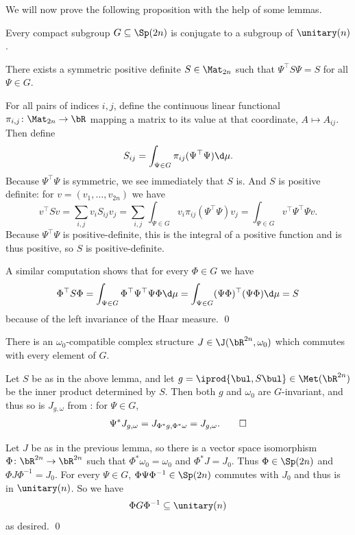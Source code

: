 We will now prove the following proposition with the help of some lemmas.

\bprop[name={compspconj}]

    Every compact subgroup $G\subseteq\Sp(2n)$ is conjugate to a subgroup of $\unitary(n)$.

\eprop

\blemm

    There exists a symmetric positive definite $S\in\Mat_{2n}$ such that $\Psi^\top S\Psi=S$ for all $\Psi\in G$.

\elemm

\bproof

    For all pairs of indices $i,j$, define the continuous linear functional $\pi_{i,j}\colon\Mat_{2n}\to\bR$ mapping a matrix to its value at that coordinate, $A\mapsto A_{ij}$.
    Then define
    $$ S_{ij} = \int_{\Psi\in G}\pi_{ij}(\Psi^\top\Psi)\d\mu . $$
    Because $\Psi^\top\Psi$ is symmetric, we see immediately that $S$ is.
    And $S$ is positive definite: for $v=(v_1,\dots,v_{2n})$ we have
    $$ v^\top Sv = \sum_{i,j}v_i S_{ij}v_j = \sum_{i,j}\int_{\Psi\in G}v_i\pi_{ij}(\Psi^\top\Psi)v_j = \int_{\Psi\in G}v^\top\Psi^\top\Psi v . $$
    Because $\Psi^\top\Psi$ is positive-definite, this is the integral of a positive function and is thus positive, so $S$ is positive-definite.

    A similar computation shows that for every $\Phi\in G$ we have
    $$ \Phi^\top S\Phi = \int_{\Psi\in G}\Phi^\top\Psi^\top\Psi\Phi\d\mu = \int_{\Psi\in G}(\Psi\Phi)^\top(\Psi\Phi)\d\mu = S $$
    because of the left invariance of the Haar measure.
    \qed

\eproof

\blemm

    There is an $\omega_0$-compatible complex structure $J\in\J(\bR^{2n},\omega_0)$ which commutes with every element of $G$.

\elemm

\bproof

    Let $S$ be as in the above lemma, and let $g=\iprod{\bul,S\bul}\in\Met(\bR^{2n})$ be the inner product determined by $S$.
    Then both $g$ and $\omega_0$ are $G$-invariant, and thus so is $J_{g,\omega}$ from : for $\Psi\in G$,
    $$ \Psi^*J_{g,\omega} = J_{\Phi^*g,\Phi^*\omega} = J_{g,\omega} . \qed $$

\eproof


    Let $J$ be as in the previous lemma, so there is a vector space isomorphism $\Phi\colon\bR^{2n}\to\bR^{2n}$ such that $\Phi^*\omega_0=\omega_0$ and $\Phi^*J=J_0$.
    Thus $\Phi\in\Sp(2n)$ and $\Phi J\Phi^{-1}=J_0$.
    For every $\Psi\in G$, $\Phi\Psi\Phi^{-1}\in\Sp(2n)$ commutes with $J_0$ and thus is in $\unitary(n)$.
    So we have
    $$ \Phi G\Phi^{-1} \subseteq \unitary(n) $$
    as desired.
    \qed

